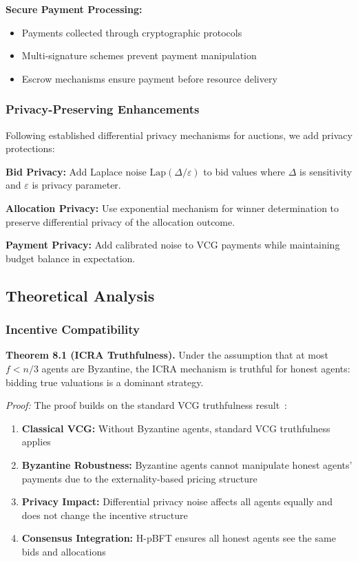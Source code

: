 \documentclass[conference]{IEEEtran}
\begin{document}
\textbf{Secure Payment Processing:}
\begin{itemize}
    \item Payments collected through cryptographic protocols
    \item Multi-signature schemes prevent payment manipulation
    \item Escrow mechanisms ensure payment before resource delivery
\end{itemize}

\subsubsection{Privacy-Preserving Enhancements}

Following established differential privacy mechanisms for auctions, we add privacy protections:

\textbf{Bid Privacy:} Add Laplace noise $\text{Lap}(\Delta/\varepsilon)$ to bid values where $\Delta$ is sensitivity and $\varepsilon$ is privacy parameter.

\textbf{Allocation Privacy:} Use exponential mechanism for winner determination to preserve differential privacy of the allocation outcome.

\textbf{Payment Privacy:} Add calibrated noise to VCG payments while maintaining budget balance in expectation.

\subsection{Theoretical Analysis}

\subsubsection{Incentive Compatibility}

\textbf{Theorem 8.1 (ICRA Truthfulness).} Under the assumption that at most $f < n/3$ agents are Byzantine, the ICRA mechanism is truthful for honest agents: bidding true valuations is a dominant strategy.

\textit{Proof:} The proof builds on the standard VCG truthfulness result~\cite{vickrey1961counterspeculation}:

\begin{enumerate}
    \item \textbf{Classical VCG:} Without Byzantine agents, standard VCG truthfulness applies
    \item \textbf{Byzantine Robustness:} Byzantine agents cannot manipulate honest agents' payments due to the externality-based pricing structure
    \item \textbf{Privacy Impact:} Differential privacy noise affects all agents equally and does not change the incentive structure
    \item \textbf{Consensus Integration:} H-pBFT ensures all honest agents see the same bids and allocations
\end{enumerate}
\end{document}
